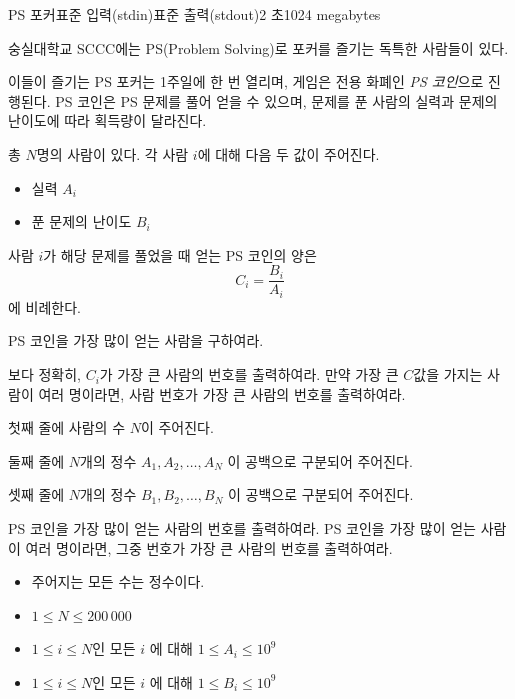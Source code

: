 \def\probtitle{PS 포커}
\def\probno{PA} %

\begin{problem}{\probtitle}{표준 입력(stdin)}{표준 출력(stdout)}{2 초}{1024 megabytes}

숭실대학교 SCCC에는 PS(Problem Solving)로 포커를 즐기는 독특한 사람들이 있다.

이들이 즐기는 PS 포커는 1주일에 한 번 열리며, 게임은 전용 화폐인 \textit{PS 코인}으로 진행된다.  
PS 코인은 PS 문제를 풀어 얻을 수 있으며, 문제를 푼 사람의 실력과 문제의 난이도에 따라 획득량이 달라진다.

총 $N$명의 사람이 있다. 각 사람 $i$에 대해 다음 두 값이 주어진다.

\begin{itemize}[topsep=0pt,noitemsep]
    \item 실력 $A_i$
    \item 푼 문제의 난이도 $B_i$
\end{itemize}

사람 $i$가 해당 문제를 풀었을 때 얻는 PS 코인의 양은
$$
C_i = \frac{B_i}{A_i}
$$
에 비례한다.

PS 코인을 가장 많이 얻는 사람을 구하여라.

보다 정확히, $C_i$가 가장 큰 사람의 번호를 출력하여라.  
만약 가장 큰 $C$값을 가지는 사람이 여러 명이라면, 사람 번호가 가장 큰 사람의 번호를 출력하여라.

\InputFile

첫째 줄에 사람의 수 $N$이 주어진다.  

둘째 줄에 $N$개의 정수 $A_1, A_2, \dots, A_N$ 이 공백으로 구분되어 주어진다.

셋째 줄에 $N$개의 정수 $B_1, B_2, \dots, B_N$ 이 공백으로 구분되어 주어진다.


\OutputFile

PS 코인을 가장 많이 얻는 사람의 번호를 출력하여라. PS 코인을 가장 많이 얻는 사람이 여러 명이라면, 그중 번호가 가장 큰 사람의 번호를 출력하여라.

\Constraints

\begin{itemize}[topsep=0pt,noitemsep]
    \item 주어지는 모든  수는 정수이다. 
    \item $1 \le N \le 200\,000$
    \item $1 \le i \le N$인 모든 $i$ 에 대해 $1 \le A_i \le 10^9$
    \item $1 \le i \le N$인 모든 $i$ 에 대해 $1 \le B_i \le 10^9$
\end{itemize}


\end{problem}
